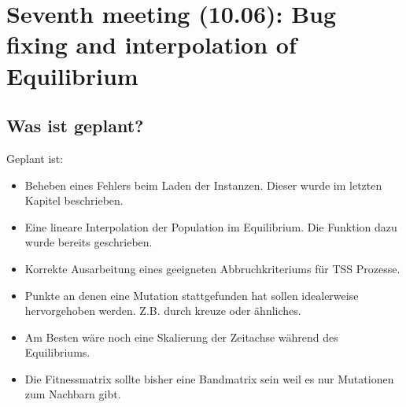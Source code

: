 \documentclass{article}
\begin{document}
\newpage
\section{Seventh meeting (10.06): Bug fixing and interpolation of Equilibrium}
\subsection{Was ist geplant?}
Geplant ist:
\begin{itemize}
	\item Beheben eines Fehlers beim Laden der Instanzen. Dieser wurde im letzten Kapitel beschrieben.
	\item Eine lineare Interpolation der Population im Equilibrium. Die Funktion dazu wurde bereits geschrieben.
	\item Korrekte Ausarbeitung eines geeigneten Abbruchkriteriums für TSS Prozesse.
	\item Punkte an denen eine Mutation stattgefunden hat sollen idealerweise hervorgehoben werden. Z.B. durch kreuze oder ähnliches.
	\item Am Besten wäre noch eine Skalierung der Zeitachse während des Equilibriums. 
	\item Die Fitnessmatrix sollte bisher eine Bandmatrix sein weil es nur Mutationen zum Nachbarn gibt.
\end{itemize}
\end{document}
